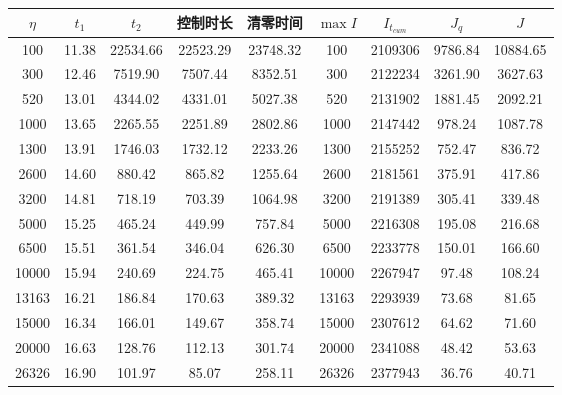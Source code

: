 \begin{tabular}{ccccccccc}
\toprule
$\eta$ & $t_1$ & $t_2$ & 控制时长 & 清零时间 & $\max I$ & $I_{t_{cum}}$ & $J_q$ & $J$ \\
\midrule
100 & 11.38 & 22534.66 & 22523.29 & 23748.32 & 100 & 2109306 & 9786.84 & 10884.65 \\
300 & 12.46 & 7519.90 & 7507.44 & 8352.51 & 300 & 2122234 & 3261.90 & 3627.63 \\
520 & 13.01 & 4344.02 & 4331.01 & 5027.38 & 520 & 2131902 & 1881.45 & 2092.21 \\
1000 & 13.65 & 2265.55 & 2251.89 & 2802.86 & 1000 & 2147442 & 978.24 & 1087.78 \\
1300 & 13.91 & 1746.03 & 1732.12 & 2233.26 & 1300 & 2155252 & 752.47 & 836.72 \\
2600 & 14.60 & 880.42 & 865.82 & 1255.64 & 2600 & 2181561 & 375.91 & 417.86 \\
3200 & 14.81 & 718.19 & 703.39 & 1064.98 & 3200 & 2191389 & 305.41 & 339.48 \\
5000 & 15.25 & 465.24 & 449.99 & 757.84 & 5000 & 2216308 & 195.08 & 216.68 \\
6500 & 15.51 & 361.54 & 346.04 & 626.30 & 6500 & 2233778 & 150.01 & 166.60 \\
10000 & 15.94 & 240.69 & 224.75 & 465.41 & 10000 & 2267947 & 97.48 & 108.24 \\
13163 & 16.21 & 186.84 & 170.63 & 389.32 & 13163 & 2293939 & 73.68 & 81.65 \\
15000 & 16.34 & 166.01 & 149.67 & 358.74 & 15000 & 2307612 & 64.62 & 71.60 \\
20000 & 16.63 & 128.76 & 112.13 & 301.74 & 20000 & 2341088 & 48.42 & 53.63 \\
26326 & 16.90 & 101.97 & 85.07 & 258.11 & 26326 & 2377943 & 36.76 & 40.71 \\
\bottomrule
\end{tabular}
